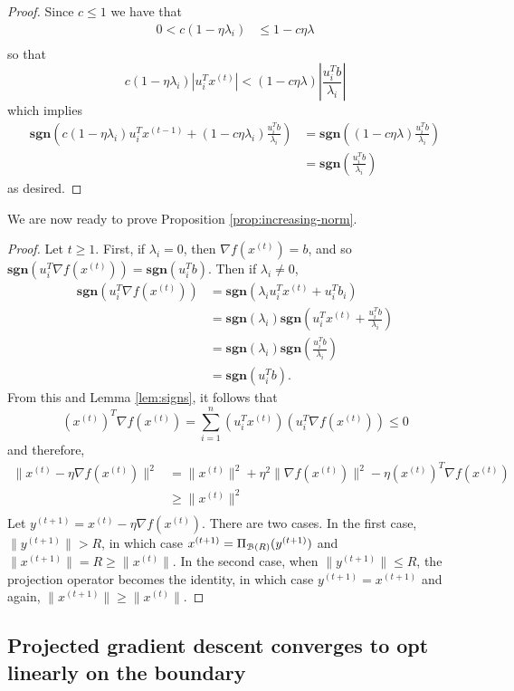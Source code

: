 \documentclass[11pt]{article}
\begin{document}
\begin{proof}
 Since $c \leq 1$ we have that
\begin{align*}
0 < c(1 - \eta \lambda_i) &\leq 1 - c \eta \lambda \\
\end{align*}
so that 
\[
c(1 - \eta \lambda_i)\left| u_i^Tx^{(t)} \right| < (1 - c \eta \lambda)\left| \frac{u_i^Tb}{\lambda_i} \right|
\]
which implies
\begin{align*}
\mathbf{sgn}\left(c(1 - \eta \lambda_i)u_i^Tx^{(t-1)} + (1 - c\eta \lambda_i) \frac{u_i^Tb}{\lambda_i} \right)
	&= \mathbf{sgn}\left((1 - c \eta \lambda)\frac{u_i^Tb}{\lambda_i} \right) \\
	&= \mathbf{sgn}\left(\frac{u_i^Tb}{\lambda_i}\right) 
\end{align*}as desired.
\end{proof}
We are now ready to prove Proposition \ref{prop:increasing-norm}.
\begin{proof}
Let $t \geq 1$. First, if $\lambda_i = 0$, then $\nabla f(x^{(t)}) = b$, and so $\mathbf{sgn}\left(u_i^T \nabla f(x^{(t)})\right) = \mathbf{sgn}(u_i^Tb)$. 
Then if $\lambda_i \neq 0$,
\begin{align*}
\mathbf{sgn}\left(u_i^T \nabla f(x^{(t)})\right) &= \mathbf{sgn}\left(\lambda_i u_i^Tx^{(t)} + u_i^Tb_i\right) \\
								&=  \mathbf{sgn}(\lambda_i)\mathbf{sgn}\left( u_i^Tx^{(t)} + \frac{u_i^Tb}{\lambda_i}\right) \\
								&= \mathbf{sgn}(\lambda_i)\mathbf{sgn}\left( \frac{u_i^Tb}{\lambda_i} \right) \\
								&= \mathbf{sgn}(u_i^Tb).
\end{align*}
From this and Lemma \ref{lem:signs}, it follows that
\[ (x^{(t)})^T\nabla f(x^{(t)}) = \sum_{i = 1}^n (u_i^Tx^{(t)})( u_i^T\nabla f(x^{(t)})) \leq 0 \]
and therefore,
\begin{align*}
\|x^{(t)} - \eta \nabla f(x^{(t)}) \|^2 &= \|x^{(t)}\|^2 + \eta^2 \|\nabla f(x^{(t)})\|^2 - \eta (x^{(t)})^T\nabla f(x^{(t)}) \\
						&\geq \|x^{(t)}\|^2 \\
\end{align*}
Let $y^{(t+1)} = x^{(t)} - \eta \nabla f(x^{(t)})$. There are two cases. In the first case, $\|y^{(t+1)}\| > R$, in which case $x^{(t+1)} = \Pi_{\mathcal{B}(R)}(y^{(t+1)})$ and
$\|x^{(t+1)}\| = R \geq \| x^{(t)} \|$. In the second case, when $\| y^{(t+1)}\| \leq R$, the projection operator becomes the identity, in which case $y^{(t+1)} = x^{(t+1)}$ and
again, $\|x^{(t+1)}\| \geq \|x^{(t)} \|$. 

\end{proof}

\subsection{Projected gradient descent converges to opt linearly on the boundary}


\end{document}
